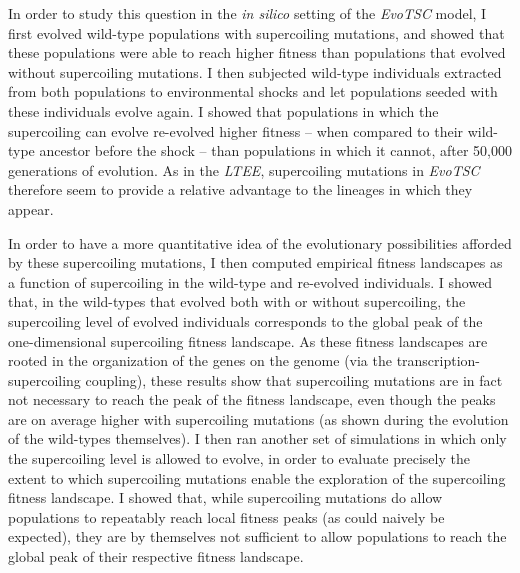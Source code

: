 In order to study this question in the \emph{in silico} setting of the \emph{EvoTSC} model, I first evolved wild-type populations with supercoiling mutations, and showed that these populations were able to reach higher fitness than populations that evolved without supercoiling mutations.
I then subjected wild-type individuals extracted from both populations to environmental shocks and let populations seeded with these individuals evolve again.
I showed that populations in which the supercoiling can evolve re-evolved higher fitness -- when compared to their wild-type ancestor before the shock -- than populations in which it cannot, after 50,000 generations of evolution.
As in the \emph{LTEE}, supercoiling mutations in \emph{EvoTSC} therefore seem to provide a relative advantage to the lineages in which they appear.

In order to have a more quantitative idea of the evolutionary possibilities afforded by these supercoiling mutations, I then computed empirical fitness landscapes as a function of supercoiling in the wild-type and re-evolved individuals.
I showed that, in the wild-types that evolved both with or without supercoiling, the supercoiling level of evolved individuals corresponds to the global peak of the one-dimensional supercoiling fitness landscape.
As these fitness landscapes are rooted in the organization of the genes on the genome (via the transcription-supercoiling coupling), these results show that supercoiling mutations are in fact not necessary to reach the peak of the fitness landscape, even though the peaks are on average higher with supercoiling mutations (as shown during the evolution of the wild-types themselves).
I then ran another set of simulations in which only the supercoiling level is allowed to evolve, in order to evaluate precisely the extent to which supercoiling mutations enable the exploration of the supercoiling fitness landscape.
I showed that, while supercoiling mutations do allow populations to repeatably reach local fitness peaks (as could naively be expected), they are by themselves not sufficient to allow populations to reach the global peak of their respective fitness landscape.

